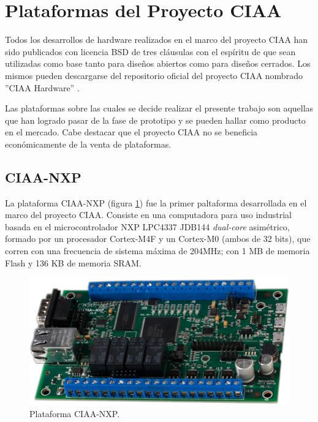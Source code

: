 \section{Plataformas del Proyecto CIAA}
\label{sec:ciaaBoards}

Todos los desarrollos de hardware realizados en el marco del proyecto CIAA han sido publicados con licencia BSD de tres cláusulas con el espíritu de que sean utilizadas como base tanto para diseños abiertos como para diseños cerrados. Los mismos pueden descargarse del repositorio oficial del proyecto CIAA nombrado ''CIAA Hardware'' \citep{ciaaHW}.

Las plataformas sobre las cuales se decide realizar el presente trabajo son aquellas que han logrado pasar de la fase de prototipo y se pueden hallar como producto en el mercado. Cabe destacar que el proyecto CIAA no se beneficia económicamente de la venta de plataformas.

\subsection{CIAA-NXP}

La plataforma CIAA-NXP (figura \ref{fig:ciaaNxp}) fue la primer paltaforma desarrollada en el marco del proyecto CIAA. Consiste en una computadora para uso industrial basada en el microcontrolador NXP LPC4337 JDB144 \citep{LPC4337} \emph{dual-core} asimétrico, formado por un procesador Cortex-M4F y un Cortex-M0 (ambos de 32 bits), que corren con una frecuencia de sistema máxima de 204MHz; con 1 MB de memoria Flash y 136 KB de memoria SRAM.


\begin{figure}[!htbp]
\begin{center}  %
\includegraphics*[width=\textwidth]{Figures/CIAA-NXP_Foto.png}
\par\caption{Plataforma CIAA-NXP.}\label{fig:ciaaNxp}
\end{center}
\end{figure}

